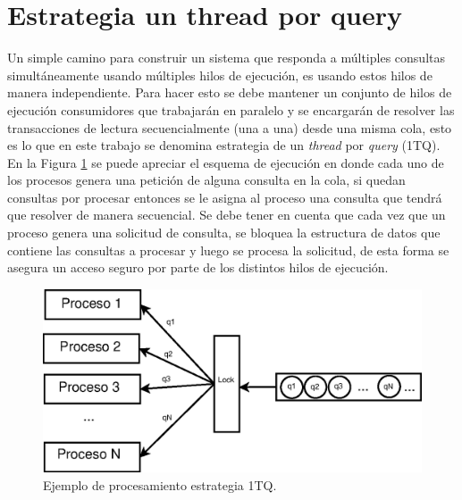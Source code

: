 \section{Estrategia un thread por query}
\label{scheduling:baseline}
Un simple camino para construir un sistema que responda a múltiples consultas simultáneamente usando múltiples hilos de ejecución, es usando estos hilos de manera independiente. Para hacer esto se debe mantener un conjunto de hilos de ejecución consumidores que trabajarán en paralelo y se encargarán de resolver las transacciones de lectura secuencialmente (una a una) desde una misma cola, esto es lo que en este trabajo se denomina estrategia de un \textit{thread} por \textit{query} (1TQ). En la Figura \ref{fig:1TQ} se puede apreciar el esquema de ejecución en donde cada uno de los procesos genera una petición de alguna consulta en la cola, si quedan consultas por procesar entonces se le asigna al proceso una consulta que tendrá que resolver de manera secuencial. Se debe tener en cuenta que cada vez que un proceso genera una solicitud de consulta, se bloquea la estructura de datos que contiene las consultas a procesar y luego se procesa la solicitud, de esta forma se asegura un acceso seguro por parte de los distintos hilos de ejecución. 

\begin{figure}[tp]
\centering
\includegraphics[scale=.75]{images/1TQ.eps}
\caption{Ejemplo de procesamiento estrategia 1TQ.}
\label{fig:1TQ}
\end{figure}


